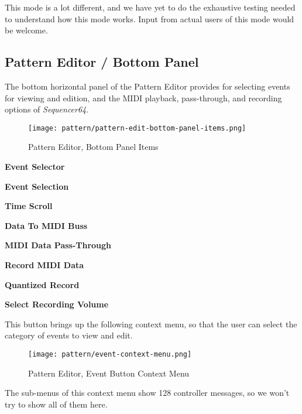    This mode is a lot different, and we have yet to do the exhaustive testing
   needed to understand how this mode works.  Input from actual users of this
   mode would be welcome.

\subsection{Pattern Editor / Bottom Panel}
\label{subsec:seq64_pattern_editor_bottom}

   The bottom horizontal panel of the Pattern Editor provides for
   selecting events for viewing and edition, and the MIDI playback,
   pass-through, and recording options of \textsl{Sequencer64}.

\begin{figure}[H]
   \centering 
   \texttt{[image: pattern/pattern-edit-bottom-panel-items.png]}
   \caption{Pattern Editor, Bottom Panel Items}
   \label{fig:pattern_editor_bottom_panel_items}
\end{figure}

   \begin{enumber}
      \item \textbf{Event Selector}
      \item \textbf{Event Selection}
      \item \textbf{Time Scroll}
      \item \textbf{Data To MIDI Buss}
      \item \textbf{MIDI Data Pass-Through}
      \item \textbf{Record MIDI Data}
      \item \textbf{Quantized Record}
      \item \textbf{Select Recording Volume}
   \end{enumber}

   \setcounter{ItemCounter}{0}      %

   This button brings up the following context menu, so that the user can
   select the category of events to view and edit.

\begin{figure}[H]
   \centering 
   \texttt{[image: pattern/event-context-menu.png]}
   \caption{Pattern Editor, Event Button Context Menu}
   \label{fig:pattern_editor_bottom_event_context_menu}
\end{figure}

   The sub-menus of this context menu show 128 controller messages,
   so we won't try to show all of them here.


